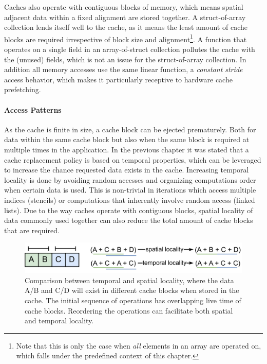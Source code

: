 \documentclass{article}
\begin{document}
Caches also operate with contiguous blocks of memory, which means spatial adjacent data within a fixed alignment are stored together.
A struct-of-array collection lends itself well to the cache, as it means the least amount of cache blocks are required irrespective of block size and alignment\footnote{Note that this is only the case when {\it all} elements in an array are operated on, which falls under the predefined context of this chapter.}.
A function that operates on a single field in an array-of-struct collection pollutes the cache with the (unused) fields, which is not an issue for the struct-of-array collection. 
In addition all memory accesses use the same linear function, a {\it constant stride} access behavior, which makes it particularly receptive to hardware cache prefetching\cite{cache-prefetching}. 

\paragraph{Access Patterns}

As the cache is finite in size, a cache block can be ejected prematurely.
Both for data within the same cache block but also when the same block is required at multiple times in the application.
In the previous chapter it was stated that a cache replacement policy is based on temporal properties, which can be leveraged to increase the chance requested data exists in the cache.
Increasing temporal locality is done by avoiding random accesses and organizing computations order when certain data is used.
This is non-trivial in iterations which access multiple indices (stencils) or computations that inherently involve random access (linked lists).
Due to the way caches operate with contiguous blocks, spatial locality of data commonly used together can also reduce the total amount of cache blocks that are required. 

\newpage

\begin{figure}[ht]
    \centering
    \includegraphics[scale=0.12]{temporalspatial.png}
    \caption
    {
        Comparison between temporal and spatial locality, where the data A/B and C/D will exist in different cache blocks when stored in the cache.
        The initial sequence of operations has overlapping live time of cache blocks.
        Reordering the operations can facilitate both spatial and temporal locality.
    }
\end{figure}
\end{document}
